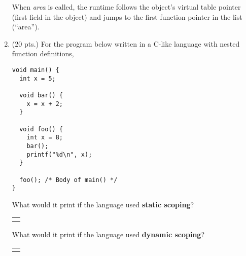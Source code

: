 \documentclass[letterpaper]{article}
\makeatletter
\newif\ifkey
\newcommand{\field}[2][]{
  \begin{tabular}{@{}c@{}}
    \fbox{\TextField[borderwidth=0,charsize=12pt,multiline=true,name={#2},#1]{}}
  \end{tabular}
  }
\makeatother
\begin{document}
\begin{Form}
\begin{enumerate}
\begin{tikzpicture}[%
  object/.style={rectangle split,
                 fill=white,
                 draw
  }
]
   
\end{tikzpicture}

When \emph{area} is called, the runtime follows the object's virtual
table pointer (first field in the object) and jumps to the first
function pointer in the list (``area'').

\fi

\vspace{5pc}

\item (20 pts.)  For the program below written in a C-like language
  with nested function definitions,

  \begin{minipage}{0.4\textwidth}
\begin{lstlisting}
void main() {
  int x = 5;
  
  void bar() {
    x = x + 2;
  }
  
  void foo() {
    int x = 8;
    bar();
    printf("%d\n", x);
  }
  
  foo(); /* Body of main() */
}
\end{lstlisting}
  \end{minipage}%
  \begin{minipage}{0.6\textwidth}
    What would it print if the language used \textbf{static scoping}?   
    \field[height=3pc,width=3pc,multiline=false]{5a}

    \vspace{2pc}

    What would it print if the language used \textbf{dynamic scoping}?    
    \field[height=3pc,width=3pc,multiline=false]{5b}
  \end{minipage}

\ifkey
Static scoping: 8 \quad \emph{bar} doesn't change local \emph{x}\\
Dynamic scoping: 10 \quad \emph{bar} changes 8 into 10 \\
\fi

\end{enumerate}

\end{Form}
\end{document}
